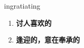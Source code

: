 
\begin{frame}
{\huge ingratiating}
\begin{center}
\begin{enumerate}\Large
  \item \textbf{讨人喜欢的}
  \item \textbf{逢迎的，意在奉承的}
\end{enumerate}
\end{center}
\end{frame}
